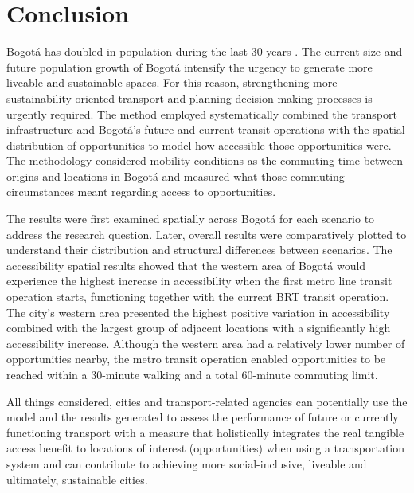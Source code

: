 \documentclass[12pt, a4paper]{report}
\begin{document}
\chapter{Conclusion} \label{Chap7}


Bogot\'{a} has doubled in population during the last 30 years \citep{guzmanCityProfileBogota2017}. The current size and future population growth of Bogotá intensify the urgency to generate more liveable and sustainable spaces. For this reason, strengthening more sustainability-oriented transport and planning decision-making processes is urgently required. The method employed systematically combined the transport infrastructure and Bogotá's future and current transit operations with the spatial distribution of opportunities to model how accessible those opportunities were. The methodology considered mobility conditions as the commuting time between origins and locations in Bogotá and measured what those commuting circumstances meant regarding access to opportunities. 


The results were first examined spatially across Bogotá for each scenario to address the research question. Later, overall results were comparatively plotted to understand their distribution and structural differences between scenarios. The accessibility spatial results showed that the western area of Bogotá would experience the highest increase in accessibility when the first metro line transit operation starts, functioning together with the current BRT transit operation. The city's western area presented the highest positive variation in accessibility combined with the largest group of adjacent locations with a significantly high accessibility increase. Although the western area had a relatively lower number of opportunities nearby, the metro transit operation enabled opportunities to be reached within a 30-minute walking and a total 60-minute commuting limit. 

All things considered, cities and transport-related agencies can potentially use the model and the results generated to assess the performance of future or currently functioning transport with a measure that holistically integrates the real tangible access benefit to locations of interest (opportunities) when using a transportation system and can contribute to achieving more social-inclusive, liveable and ultimately, sustainable cities.

\end{document}
